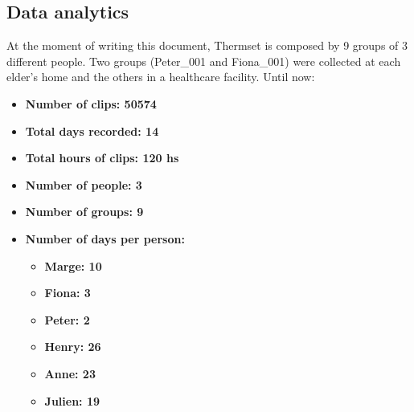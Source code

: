 \documentclass[oneside, twocolumn]{article}
\newcommand\NumberOfGroups{9}
\newcommand\TotalHoursOfRecording{120}
\newcommand\TotalNumbersOfDays{14}
\newcommand\NumberOfPeople{3}
\newcommand\NumberOfClips{50574}
\newcommand\FemaleDays{57}
\newcommand\MaleDays{82}
\newcommand\LessThanSixtyFiveDays{49}
\newcommand\LessThanSeventyFiveDays{15}
\newcommand\LessThanEightyFiveDays{39}
\newcommand\MoreThanEightyFiveDays{36}
\newcommand\HenryDays{26}
\newcommand\AnneDays{23}
\newcommand\JulienDays{19}
\newcommand\MargeDays{10}
\newcommand\FionaDays{3}
\newcommand\PeterDays{2}
\begin{document}
\subsection{Data analytics}
At the moment of writing this document, Thermset is composed by \NumberOfGroups{} groups of \NumberOfPeople{} different people.
Two groups (Peter\_001 and Fiona\_001) were collected at each elder's home and the others in a
healthcare facility. Until now:

\begin{itemize}
	\item \textbf{Number of clips: \NumberOfClips{}}
  \item \textbf{Total days recorded: \TotalNumbersOfDays{}}
  \item \textbf{Total hours of clips: \TotalHoursOfRecording{} hs}
  \item \textbf{Number of people: \NumberOfPeople{}}
  \item \textbf{Number of groups: \NumberOfGroups{}}

  \item \textbf{Number of days per person:}
  \begin{itemize}
    \item \textbf{Marge: \MargeDays{}}
    \item \textbf{Fiona: \FionaDays{}}
    \item \textbf{Peter: \PeterDays{}}
    \iffalse
    \item \textbf{Henry: \HenryDays{}}
    \item \textbf{Anne: \AnneDays{}}
    \item \textbf{Julien: \JulienDays{}}

\end{itemize}
\end{itemize}
\end{document}

